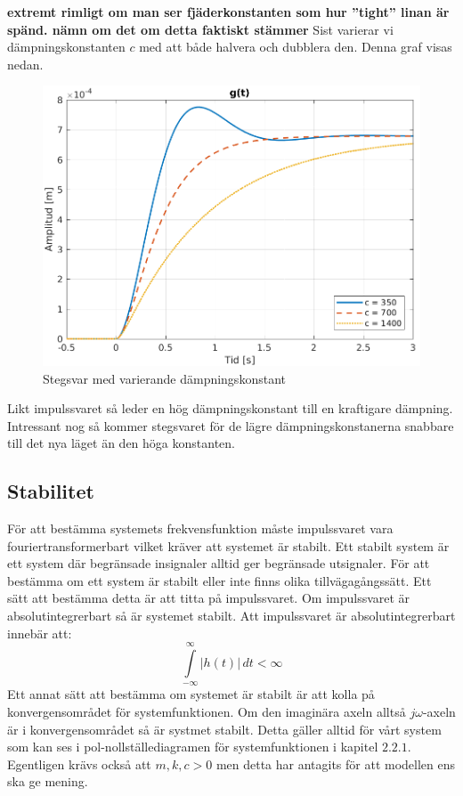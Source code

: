 \textbf{extremt rimligt om man ser fjäderkonstanten som hur ''tight'' linan är spänd. nämn om det om detta faktiskt stämmer}
\newpage
Sist varierar vi dämpningskonstanten $c$ med att både halvera och dubblera den. Denna graf visas nedan.
\begin{figure}[H]
    \centering
    \includegraphics[scale=0.9]{bilder/stegsvar_variation_c}
    \caption{Stegsvar med varierande dämpningskonstant}
    \label{fig:stegsvar_variation_c}
\end{figure}
Likt impulssvaret så leder en hög dämpningskonstant till en kraftigare dämpning. Intressant nog så kommer stegsvaret för de lägre dämpningskonstanerna snabbare till det nya läget än den höga konstanten. 

\newpage
\subsection{Stabilitet}
För att bestämma systemets frekvensfunktion måste impulssvaret vara fouriertransformerbart vilket kräver att systemet är stabilt. Ett stabilt system är ett system där begränsade insignaler alltid ger begränsade utsignaler. För att bestämma om ett system är stabilt eller inte finns olika tillvägagångssätt. Ett sätt att bestämma detta är att titta på impulssvaret. Om impulssvaret är absolutintegrerbart så är systemet stabilt. Att impulssvaret är absolutintegrerbart innebär att:
$$\int\limits_{-\infty}^{\infty}\big|h(t)\big|\,dt < \infty$$
Ett annat sätt att bestämma om systemet är stabilt är att kolla på konvergensområdet för systemfunktionen. Om den imaginära axeln alltså $j\omega$-axeln är i konvergensområdet så är systmet stabilt.
Detta gäller alltid för vårt system som kan ses i pol-nollställediagramen för systemfunktionen i kapitel $2.2.1$. Egentligen krävs också att $m,k,c>0$ men detta har antagits för att modellen ens ska ge mening.
